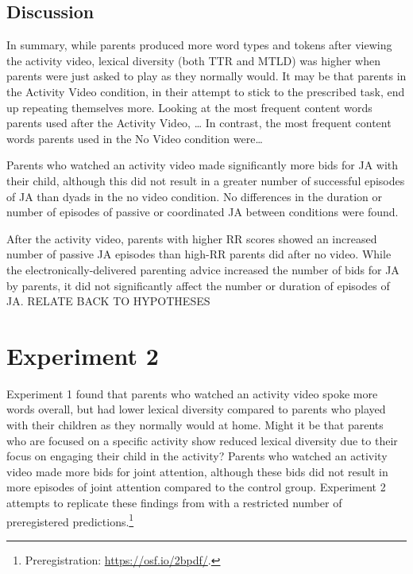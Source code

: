 \documentclass[man,floatsintext]{apa6}
\let\rmarkdownfootnote\footnote%
\def\footnote{\protect\rmarkdownfootnote}
\begin{document}
\hypertarget{discussion}{%
\subsection{Discussion}\label{discussion}}

In summary, while parents produced more word types and tokens after viewing the activity video, lexical diversity (both TTR and MTLD) was higher when parents were just asked to play as they normally would.
It may be that parents in the Activity Video condition, in their attempt to stick to the prescribed task, end up repeating themselves more.
Looking at the most frequent content words parents used after the Activity Video, \ldots{}
In contrast, the most frequent content words parents used in the No Video condition were\ldots{}

Parents who watched an activity video made significantly more bids for JA with their child, although this did not result in a greater number of successful episodes of JA than dyads in the no video condition.
No differences in the duration or number of episodes of passive or coordinated JA between conditions were found.

After the activity video, parents with higher RR scores showed an increased number of passive JA episodes than high-RR parents did after no video.
While the electronically-delivered parenting advice increased the number of bids for JA by parents, it did not significantly affect the number or duration of episodes of JA.
RELATE BACK TO HYPOTHESES

\hypertarget{experiment-2}{%
\section{Experiment 2}\label{experiment-2}}

Experiment 1 found that parents who watched an activity video spoke more words overall, but had lower lexical diversity compared to parents who played with their children as they normally would at home.
Might it be that parents who are focused on a specific activity show reduced lexical diversity due to their focus on engaging their child in the activity?
Parents who watched an activity video made more bids for joint attention, although these bids did not result in more episodes of joint attention compared to the control group.
Experiment 2 attempts to replicate these findings from with a restricted number of preregistered predictions.\footnote{Preregistration: \url{https://osf.io/2bpdf/}.}
\end{document}
